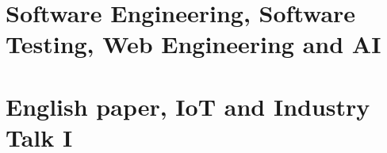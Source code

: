 \documentclass[12pt,oneside,a4paper]{book}
\newif\ifShowPaper	\ShowPapertrue
\begin{document}
\ifShowPaper
\chapter{Software Engineering, Software Testing, Web Engineering and AI}

\TimeOne

\section{\TitleOneA}
\subsection*{\ChairOneA}
\ListOneA
\PaperOneA

\section{\TitleOneB}
\subsection*{\ChairOneB}
\ListOneB
\PaperOneB

\section{\TitleOneC}
\subsection*{\ChairOneC}
\ListOneC
\PaperOneC

\section{\TitleOneD}
\subsection*{\ChairOneD}
\ListOneD
\PaperOneD

\chapter{English paper, IoT and Industry Talk I}
\TimeTwo

\section{\TitleTwoA}
\subsection*{\ChairTwoA}
\ListTwoA
\PaperTwoA
\end{document}
